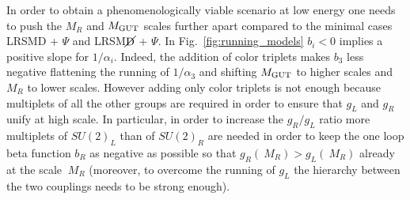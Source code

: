 \documentclass[11pt]{article}
\newcommand{\MR}{\:M_{R}}
\newcommand{\Figref}[1]{Fig.~\ref{#1}}
\begin{document}
In order to obtain a phenomenologically viable scenario at low energy one needs to push the $M_R$ and $M_{\rm GUT}$ scales further apart compared to the minimal cases LRSMD + $\Psi$ and LRSM$\cancel{\rm D}$ + $\Psi$.
In \Figref{fig:running_models} $b_i<0$ implies a positive slope for $1/\alpha_i$. 
Indeed, the addition of color triplets makes $b_3$ less negative flattening the running of $1/\alpha_3$ and shifting $M_{\rm GUT}$ to higher scales and $M_R$ to lower scales.  However adding only color triplets is not enough because multiplets of all the other groups are required in order to ensure that $g_L$ and $g_R$ unify at high scale. In  particular, in order to increase the $g_R/g_L$ ratio more multiplets of $SU(2)_L$ than of $SU(2)_R$ are needed in order to keep the one loop beta function $b_R$ as negative as possible so that $g_R(\MR) > g_L (\MR)$  already at the scale $\MR$ (moreover, to overcome the running of $g_L$ the hierarchy between the two couplings needs to be strong enough).

%

%
%

\end{document}
